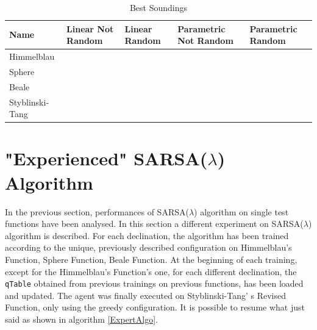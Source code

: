 \begin{table} 
	\centering
	\label{table:BestSoundings}
	\caption{Best Soundings}
	\begin{tabular}
		{l l l l l} \hline Name & Linear Not Random & Linear Random & Parametric Not Random & Parametric Random \\
		\hline Himmelblau & \vtop{\hbox{\strut $2486.938$}\hbox{\strut $(2.67, 1.34)$}\hbox{\strut}\hbox{\strut}} &\cellcolor{blue!25} \vtop{\hbox{\strut $2498.457$}\hbox{\strut $(3.67, -1.57)$}\hbox{\strut}\hbox{\strut}} & \vtop{\hbox{\strut $2485.972$}\hbox{\strut $(-2.1, 3.30)$}\hbox{\strut}\hbox{\strut}} & \vtop{\hbox{\strut $2492.11$}\hbox{\strut $(-2.283, 3.234)$}\hbox{\strut}\hbox{\strut}} \\
		Sphere & \vtop{\hbox{\strut $3484.44$}\hbox{\strut $(-8.8, -0.67)$}\hbox{\strut}\hbox{\strut}} & \vtop{\hbox{\strut $3537.986$}\hbox{\strut $(-3.24, 3.40)$}\hbox{\strut}\hbox{\strut}} &\cellcolor{blue!25} \vtop{\hbox{\strut $3557.722$}\hbox{\strut $(-1.034, -1.099)$}\hbox{\strut}\hbox{\strut}} & \vtop{\hbox{\strut $3553.626$}\hbox{\strut $(1.69, 1.88)$}\hbox{\strut}\hbox{\strut}} \\
		Beale & \vtop{\hbox{\strut $1985.797$}\hbox{\strut $(0, 0)$}\hbox{\strut}\hbox{\strut}} & \vtop{\hbox{\strut $1472.184$}\hbox{\strut $(1.69, 2.269)$}\hbox{\strut}\hbox{\strut}} &\cellcolor{blue!25} \vtop{\hbox{\strut $1997.392$}\hbox{\strut $(-0.77, 1.559)$}\hbox{\strut}\hbox{\strut}} & \vtop{\hbox{\strut $1994.983$}\hbox{\strut $(1.309, -0.89)$}\hbox{\strut}\hbox{\strut}} \\
		Styblinski-Tang & \vtop{\hbox{\strut $5153.086$}\hbox{\strut $(-2.67, -2.67)$}\hbox{\strut}\hbox{\strut}} & \vtop{\hbox{\strut $5126.192$}\hbox{\strut $(3, -2.97)$}\hbox{\strut}\hbox{\strut}} &\cellcolor{blue!25} \vtop{\hbox{\strut $5155.97$}\hbox{\strut $(-2.77, -2.95)$}\hbox{\strut}\hbox{\strut}} & \vtop{\hbox{\strut $5154.053$}\hbox{\strut $(-3.17, -2.99)$}\hbox{\strut}\hbox{\strut}} \\
		\hline
	\end{tabular}
\end{table}

\section{"Experienced" SARSA($\lambda$) Algorithm}

In the previous section, performances of SARSA($\lambda$) algorithm on single test functions have been analysed. In this section a different experiment on SARSA($\lambda$) algorithm is described. For each declination, the algorithm has been trained according to the unique, previously described configuration on Himmelblau's Function, Sphere Function, Beale Function. At the beginning of each training, except for the Himmelblau's Function's one, for each different declination, the {\tt qTable} obtained from previous trainings on previous functions, has been loaded and updated. The agent was finally executed on Styblinski-Tang' s Revised Function, only using the greedy configuration. It is possible to resume what just said as shown in algorithm \ref{ExpertAlgo}.

